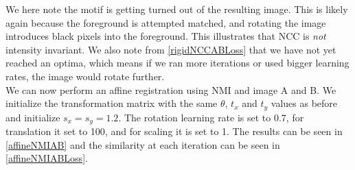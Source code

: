 We here note the motif is getting turned out of the resulting image. This is likely again because the foreground is attempted matched, and rotating the image introduces black pixels into the foreground. This illustrates that NCC is \textit{not} intensity invariant. We also note from \autoref{rigidNCCABLoss} that we have not yet reached an optima, which means if we ran more iterations or used bigger learning rates, the image would rotate further.\\
We can now perform an affine registration using NMI and image A and B. We initialize the transformation matrix with the same $\theta$, $t_x$ and $t_y$ values as before and initialize $s_x = s_y = 1.2$. The rotation learning rate is set to 0.7, for translation it set to 100, and for scaling it is set to 1. The results can be seen in \autoref{affineNMIAB} and the similarity at each iteration can be seen in \autoref{affineNMIABLoss}.

